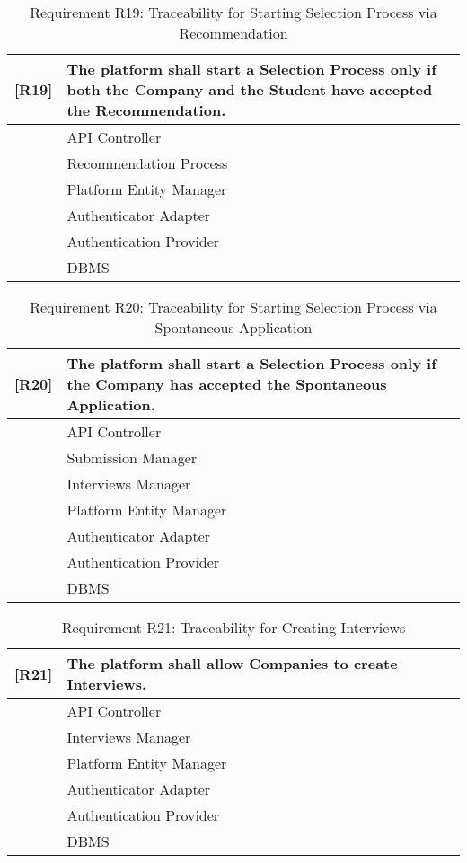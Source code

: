 \begin{table}[H]
    \centering
    \begin{tabular}{|p{1cm}|p{14cm}|}
    \hline
    \textbf{[R19]} & \textbf{The platform shall start a Selection Process only if both the Company and the Student have accepted the Recommendation.} \\ \hline
    [C1] & API Controller \\ \hline
    [C4] & Recommendation Process \\ \hline
    [C10] & Platform Entity Manager \\ \hline
    [C11] & Authenticator Adapter \\ \hline
    [E3] & Authentication Provider \\ \hline
    [E4] & DBMS \\ \hline
    \end{tabular}
    \caption{Requirement R19: Traceability for Starting Selection Process via Recommendation}
    \label{tab:RT19}
\end{table}

\begin{table}[H]
    \centering
    \begin{tabular}{|p{1cm}|p{14cm}|}
    \hline
    \textbf{[R20]} & \textbf{The platform shall start a Selection Process only if the Company has accepted the Spontaneous Application.} \\ \hline
    [C1] & API Controller \\ \hline
    [C5] & Submission Manager \\ \hline
    [C6] & Interviews Manager \\ \hline
    [C10] & Platform Entity Manager \\ \hline
    [C11] & Authenticator Adapter \\ \hline
    [E3] & Authentication Provider \\ \hline
    [E4] & DBMS \\ \hline
    \end{tabular}
    \caption{Requirement R20: Traceability for Starting Selection Process via Spontaneous Application}
    \label{tab:RT20}
\end{table}

\begin{table}[H]
    \centering
    \begin{tabular}{|p{1cm}|p{14cm}|}
    \hline
    \textbf{[R21]} & \textbf{The platform shall allow Companies to create Interviews.} \\ \hline
    [C1] & API Controller \\ \hline
    [C6] & Interviews Manager \\ \hline
    [C10] & Platform Entity Manager \\ \hline
    [C11] & Authenticator Adapter \\ \hline
    [E3] & Authentication Provider \\ \hline
    [E4] & DBMS \\ \hline
    \end{tabular}
    \caption{Requirement R21: Traceability for Creating Interviews}
    \label{tab:RT21}
\end{table}

